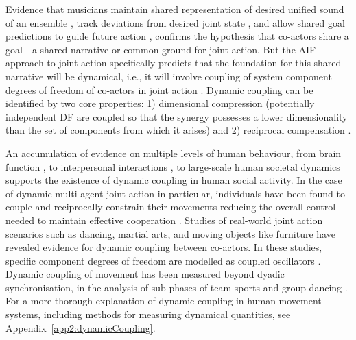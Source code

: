 \begin{CJK}{UTF8}{gbsn}
Evidence that musicians maintain shared representation of desired unified sound of an ensemble \citep{Keller2008}, track deviations from desired joint state \citep{Loehr2013}, and allow shared goal predictions to guide future action \citep{Loehr2016}, confirms the hypothesis that co-actors share a goal---a shared narrative or common ground for joint action.  But the AIF approach to joint action specifically predicts that the foundation for this shared narrative will be dynamical, i.e., it will involve coupling of system component degrees of freedom of co-actors in joint action \citep{Turvey1978,Schmidt1990}. Dynamic coupling can be identified by two core properties:  1) dimensional compression (potentially independent DF are coupled so that the synergy possesses a lower dimensionality than the set of components from which it arises) and 2) reciprocal compensation \citep[the ability of one component of a synergy to react to changes in others][]{Riley2011}.

An accumulation of evidence on multiple levels of human behaviour, from brain function \citep{Yufik1998,Sengupta2013}, to interpersonal interactions \citep{Kelso2009,Riley2011,Fusaroli2014}, to large-scale human societal dynamics \citep{Nowak2017} supports the existence of dynamic coupling in human social activity.  In the case of dynamic multi-agent joint action in particular, individuals have been found to couple and reciprocally constrain their movements reducing the overall control needed to maintain effective cooperation \citep{Ramenzoni2011,Ramenzoni2012,Riley2011,Schmidt1990}.  Studies of real-world joint action scenarios such as dancing, martial arts, and moving objects like furniture have revealed evidence for dynamic coupling between co-actors.  In these studies, specific component degrees of freedom are modelled as coupled oscillators \citep[using the HKB model, which describes the change in the relative phase between two oscillatory components. See][]{Haken1985,Kelso1986}.  Dynamic coupling of movement has been measured beyond dyadic synchronisation, in the analysis of sub-phases of team sports  \citep{Passos2014,Duarte2012} and group dancing \citep{Chauvigne2017}.  For a more thorough explanation of dynamic coupling in human movement systems, including methods for measuring dynamical quantities, see Appendix~\ref{app2:dynamicCoupling}.


\end{CJK}
